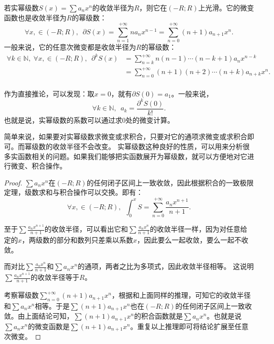 \documentclass[12pt,UTF8,fontset=none]{ctexbook}
\begin{document}
\begin{appendix}
\begin{tm}\label{tm:c-4-30}
    若实幂级数$S(x) = \sum a_n x^n$的收敛半径为$R$，则它在$(-R;R)$上光滑。它的微变函数也是收敛半径为$R$的幂级数：
    $$ \forall x, \in (-R;R),\,\,\, \partial S(x) =  \sum_{n=1}^{+\infty} na_n x^{n-1} = \sum_{n=0}^{+\infty} (n + 1)a_{n+1} x^{n}. $$
    一般来说，它的任意次微变都是收敛半径为$R$的幂级数：
    \begin{align*}
        \forall k \in \mathbb{N},\;\forall x, \in (-R;R),\,\,\, \partial^k S(x) &= \sum_{n=k}^{+\infty} n(n-1)\cdots(n - k + 1)a_n x^{n-k} \\
        &= \sum_{n=0}^{+\infty} (n + 1)(n + 2)\cdots(n + k)a_{n+k} x^{n}. \\
    \end{align*}
\end{tm}

作为直接推论，可以发现：取$x=0$，就有$\partial S(0) = a_1$。一般来说，
$$\forall k\in \mathbb{N}, \,\,\, a_k = \frac{\partial^k S(0)}{k!}.$$
也就是说，实幂级数的系数可以通过求$0$处的微变计算。

简单来说，如果要对实幂级数求微变或求积合，只要对它的通项求微变或求积合即可。而幂级数的收敛半径不会改变。
实幂级数这种良好的性质，可以用来分析很多实函数相关的问题。如果我们能够把实函数展开为幂级数，就可以方便地对它进行微变、积合操作。

\begin{proof}
    $\sum a_n x^n$在$(-R;R)$的任何闭子区间上一致收敛，因此根据积合的一致极限定理，级数求和与积合操作可以交换。即有：
    $$ \forall x, \in (-R;R),\,\,\, \int_0^x S = \sum_{n=0}^{+\infty} \frac{a_n x^{n+1}}{n + 1}. $$
    
    至于$\sum \frac{a_n x^{n+1}}{n + 1}$的收敛半径，可以看出它和$\sum \frac{a_n x^{n}}{n + 1}$的收敛半径一样，因为对任意给定的$x$，两级数的部分和数列只差乘以系数$x$，因此要么一起收敛，要么一起不收敛。
    
    而对比$\sum \frac{a_n x^{n}}{n + 1}$和$\sum a_n x^n$的通项，两者之比为多项式，因此收敛半径相等。    这说明$\sum \frac{a_n x^{n+1}}{n + 1}$的收敛半径等于$R$。

    考察幂级数$\sum_{n=0}^{+\infty} (n + 1)a_{n+1} x^{n}$，根据和上面同样的推理，可知它的收敛半径和$\sum a_n x^n$相等。于是$\sum (n + 1)a_{n+1} x^{n}$也在$(-R;R)$的任何闭子区间上一致收敛。由上面结论可知，$\sum (n + 1)a_{n+1} x^{n}$的积合函数就是$\sum a_n x^n$。也就是说$\sum a_n x^n$的微变函数是$\sum (n + 1)a_{n+1} x^{n}$。重复以上推理即可将结论扩展至任意次微变。

\end{proof}


\end{appendix}
\end{document}
